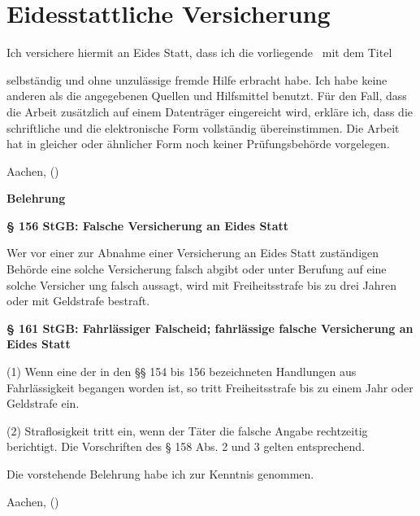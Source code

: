 \chapter*{Eidesstattliche Versicherung}
\thispagestyle{empty}
\begin{small}
\noindent Ich versichere hiermit an Eides Statt, dass ich die vorliegende \THESISTYPE\ mit dem Titel
\begin{center}
  \TITLEGER
\end{center}
\noindent selbständig und ohne unzulässige fremde Hilfe erbracht habe. Ich habe keine anderen als die angegebenen Quellen und Hilfsmittel benutzt. Für den Fall, dass die Arbeit zusätzlich auf einem Datenträger eingereicht wird, erkläre ich, dass die schriftliche und die elektronische Form vollständig übereinstimmen. Die Arbeit hat in gleicher oder ähnlicher Form noch keiner Prüfungsbehörde vorgelegen.
\vspace{3\baselineskip}

\noindent Aachen, \DATE \hfill (\AUTHOR)

\vfill
\noindent \textbf{Belehrung}
\vspace{1\baselineskip}

\noindent \textbf{§ 156 StGB: Falsche Versicherung an Eides Statt}

\noindent Wer vor einer zur Abnahme einer Versicherung an Eides Statt zuständigen Behörde eine solche Versicherung falsch abgibt oder unter Berufung auf eine solche Versicher ung falsch aussagt, wird mit Freiheitsstrafe bis zu drei Jahren oder mit Geldstrafe bestraft. 
\vspace{1\baselineskip}

\noindent \textbf{§ 161 StGB: Fahrlässiger Falscheid; fahrlässige falsche Versicherung an Eides Statt}

\noindent (1) Wenn eine der in den §§ 154 bis 156 bezeichneten Handlungen aus Fahrlässigkeit begangen worden ist, so tritt Freiheitsstrafe bis zu einem Jahr oder Geldstrafe ein.

\noindent (2) Straflosigkeit tritt ein, wenn der Täter die falsche Angabe rechtzeitig berichtigt. Die Vorschriften des § 158 Abs. 2 und 3 gelten entsprechend.  
\vspace{1\baselineskip}

\noindent Die vorstehende Belehrung habe ich zur Kenntnis genommen.
\vspace{3\baselineskip}

\noindent Aachen, \DATE \hfill (\AUTHOR)
\end{small}
